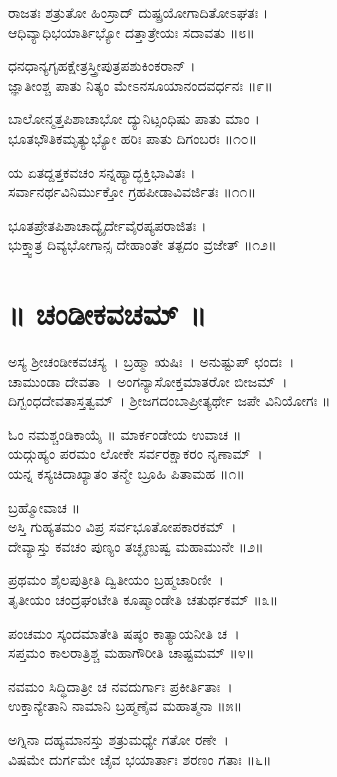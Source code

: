 ರಾಜತಃ ಶತ್ರುತೋ ಹಿಂಸ್ರಾದ್ ದುಷ್ಪ್ರಯೋಗಾದಿತೋಽಘತಃ ।\\
ಆಧಿವ್ಯಾಧಿಭಯಾರ್ತಿಭ್ಯೋ ದತ್ತಾತ್ರೇಯಃ ಸದಾವತು ॥೮॥

ಧನಧಾನ್ಯಗೃಹಕ್ಷೇತ್ರಸ್ತ್ರೀಪುತ್ರಪಶುಕಿಂಕರಾನ್ ।\\
ಜ್ಞಾತೀಂಶ್ಚ ಪಾತು ನಿತ್ಯಂ ಮೇಽನಸೂಯಾನಂದವರ್ಧನಃ ॥೯॥

ಬಾಲೋನ್ಮತ್ತಪಿಶಾಚಾಭೋ ದ್ಯುನಿಟ್ಸಂಧಿಷು ಪಾತು ಮಾಂ ।\\
ಭೂತಭೌತಿಕಮೃತ್ಯುಭ್ಯೋ ಹರಿಃ ಪಾತು ದಿಗಂಬರಃ ॥೧೦॥

ಯ ಏತದ್ದತ್ತಕವಚಂ ಸನ್ನಹ್ಯಾದ್ಭಕ್ತಿಭಾವಿತಃ ।\\
ಸರ್ವಾನರ್ಥವಿನಿರ್ಮುಕ್ತೋ ಗ್ರಹಪೀಡಾವಿವರ್ಜಿತಃ ॥೧೧॥

ಭೂತಪ್ರೇತಪಿಶಾಚಾದ್ಯೈರ್ದೇವೈರಪ್ಯಪರಾಜಿತಃ ।\\
ಭುಕ್ತ್ವಾತ್ರ ದಿವ್ಯಭೋಗಾನ್ಸ ದೇಹಾಂತೇ ತತ್ಪದಂ ವ್ರಜೇತ್ ॥೧೨॥


\section{॥ ಚಂಡೀಕವಚಮ್ ॥}
ಅಸ್ಯ ಶ್ರೀಚಂಡೀಕವಚಸ್ಯ~। ಬ್ರಹ್ಮಾ ಋಷಿಃ~। ಅನುಷ್ಟುಪ್ ಛಂದಃ~।\\ ಚಾಮುಂಡಾ ದೇವತಾ~। ಅಂಗನ್ಯಾಸೋಕ್ತಮಾತರೋ ಬೀಜಮ್~।\\ದಿಗ್ಬಂಧದೇವತಾಸ್ತತ್ವಮ್~। ಶ್ರೀಜಗದಂಬಾಪ್ರೀತ್ಯರ್ಥೇ ಜಪೇ ವಿನಿಯೋಗಃ ॥

ಓಂ ನಮಶ್ಚಂಡಿಕಾಯೈ ॥ ಮಾರ್ಕಂಡೇಯ ಉವಾಚ ॥\\
ಯದ್ಗುಹ್ಯಂ ಪರಮಂ ಲೋಕೇ ಸರ್ವರಕ್ಷಾಕರಂ ನೃಣಾಮ್~।\\
ಯನ್ನ ಕಸ್ಯಚಿದಾಖ್ಯಾತಂ ತನ್ಮೇ ಬ್ರೂಹಿ ಪಿತಾಮಹ ॥೧॥

ಬ್ರಹ್ಮೋವಾಚ ॥\\
ಅಸ್ತಿ ಗುಹ್ಯತಮಂ ವಿಪ್ರ ಸರ್ವಭೂತೋಪಕಾರಕಮ್~।\\
ದೇವ್ಯಾಸ್ತು ಕವಚಂ ಪುಣ್ಯಂ ತಚ್ಛೃಣುಷ್ವ ಮಹಾಮುನೇ ॥೨॥

ಪ್ರಥಮಂ ಶೈಲಪುತ್ರೀತಿ ದ್ವಿತೀಯಂ ಬ್ರಹ್ಮಚಾರಿಣೀ~।\\
ತೃತೀಯಂ ಚಂದ್ರಘಂಟೇತಿ ಕೂಷ್ಮಾಂಡೇತಿ ಚತುರ್ಥಕಮ್ ॥೩॥

ಪಂಚಮಂ ಸ್ಕಂದಮಾತೇತಿ ಷಷ್ಠಂ ಕಾತ್ಯಾಯನೀತಿ ಚ~।\\
ಸಪ್ತಮಂ ಕಾಲರಾತ್ರಿಶ್ಚ ಮಹಾಗೌರೀತಿ ಚಾಷ್ಟಮಮ್ ॥೪॥

ನವಮಂ ಸಿದ್ಧಿದಾತ್ರೀ ಚ ನವದುರ್ಗಾಃ ಪ್ರಕೀರ್ತಿತಾಃ~।\\
ಉಕ್ತಾನ್ಯೇತಾನಿ ನಾಮಾನಿ ಬ್ರಹ್ಮಣೈವ ಮಹಾತ್ಮನಾ ॥೫॥

ಅಗ್ನಿನಾ ದಹ್ಯಮಾನಸ್ತು ಶತ್ರುಮಧ್ಯೇ ಗತೋ ರಣೇ~।\\
ವಿಷಮೇ ದುರ್ಗಮೇ ಚೈವ ಭಯಾರ್ತಾಃ ಶರಣಂ ಗತಾಃ ॥೬॥

